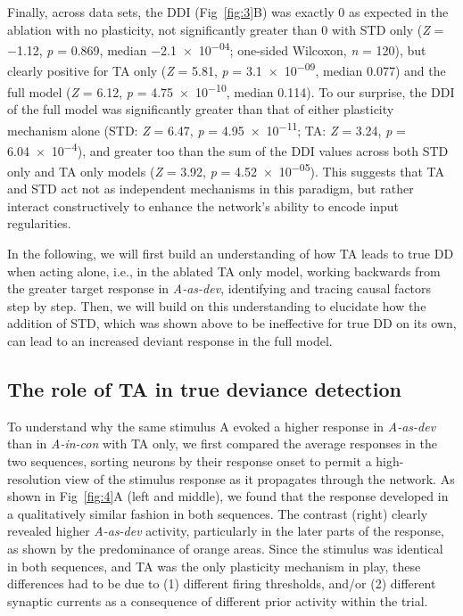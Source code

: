\documentclass[10pt,letterpaper]{article}
\newcommand{\dev}{\textit{A-as-dev}}
\newcommand{\msc}{\textit{A-in-con}}
\newcommand{\FIG}[1]{Fig~\ref{fig:#1}}
\newcommand{\statistic}[2]{\textit{#1} = \num{#2}}
\begin{document}
Finally, across data sets, the DDI (\FIG{3}B) was exactly 0 as expected in the ablation with no plasticity, not significantly greater than 0 with STD only (\statistic{Z}{-1.12}, \statistic{p}{0.869}, median \num{-2.1e-04}; one-sided Wilcoxon, \statistic{n}{120}), but clearly positive for TA only (\statistic{Z}{5.81}, \statistic{p}{3.1e-09}, median \num{0.077}) and the full model (\statistic{Z}{6.12}, \statistic{p}{4.75e-10}, median \num{0.114}). To our surprise, the DDI of the full model was significantly greater than that of either plasticity mechanism alone (STD: \statistic{Z}{6.47}, \statistic{p}{4.95e-11}; TA: \statistic{Z}{3.24}, \statistic{p}{6.04e-4}), and greater too than the sum of the DDI values across both STD only and TA only models (\statistic{Z}{3.92}, \statistic{p}{4.52e-05}). This suggests that TA and STD act not as independent mechanisms in this paradigm, but rather interact constructively to enhance the network's ability to encode input regularities.

In the following, we will first build an understanding of how TA leads to true DD when acting alone, i.e., in the ablated TA only model, working backwards from the greater target response in \dev{}, identifying and tracing causal factors step by step. Then, we will build on this understanding to elucidate how the addition of STD, which was shown above to be ineffective for true DD on its own, can lead to an increased deviant response in the full model.

\subsection*{The role of TA in true deviance detection}

To understand why the same stimulus A evoked a higher response in \dev{} than in \msc{} with TA only, we first compared the average responses in the two sequences, sorting neurons by their response onset to permit a high-resolution view of the stimulus response as it propagates through the network. As shown in \FIG{4}A (left and middle), we found that the response developed in a qualitatively similar fashion in both sequences. The contrast (right) clearly revealed higher \dev{} activity, particularly in the later parts of the response, as shown by the predominance of orange areas. Since the stimulus was identical in both sequences, and TA was the only plasticity mechanism in play, these differences had to be due to (1) different firing thresholds, and/or (2) different synaptic currents as a consequence of different prior activity within the trial.
\end{document}
